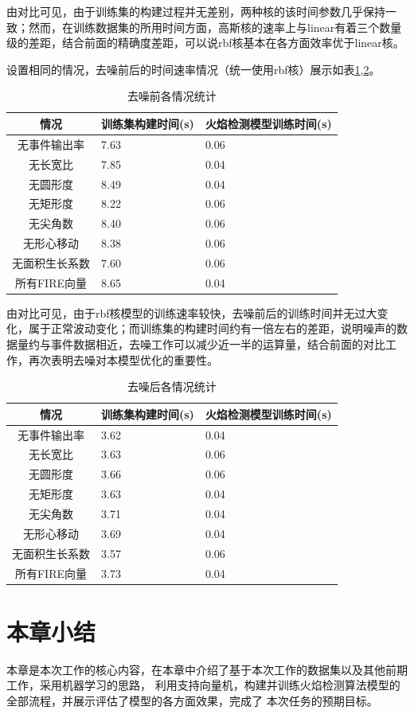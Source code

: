由对比可见，由于训练集的构建过程并无差别，两种核的该时间参数几乎保持一致；然而，在训练数据集的所用时间方面，高斯核的速率上与linear有着三个数量级的差距，结合前面的精确度差距，可以说rbf核基本在各方面效率优于linear核。

设置相同的情况，去噪前后的时间速率情况（统一使用rbf核）展示如表\ref{t_噪前},\ref{t_噪后}。
\begin{table}[ht]
    \centering
    \caption{去噪前各情况统计}
    \begin{tabularx}{0.7\textwidth}{c|X|X}
        \toprule
        情况&训练集构建时间(s)&火焰检测模型训练时间(s)\\
        \midrule
        无事件输出率&7.63&0.06\\
        无长宽比&7.85&0.04\\
        无圆形度&8.49&0.04\\
        无矩形度&8.22&0.06\\
        无尖角数&8.40&0.06\\
        无形心移动&8.38&0.06\\
        无面积生长系数&7.60&0.06\\
        所有FIRE向量&8.65&0.04\\
        \bottomrule
    \end{tabularx}
    \label{t_噪前}
\end{table}



由对比可见，由于rbf核模型的训练速率较快，去噪前后的训练时间并无过大变化，属于正常波动变化；而训练集的构建时间约有一倍左右的差距，说明噪声的数据量约与事件数据相近，去噪工作可以减少近一半的运算量，结合前面的对比工作，再次表明去噪对本模型优化的重要性。
\begin{table}[ht]
    \centering
    \caption{去噪后各情况统计}
    \begin{tabularx}{0.7\textwidth}{c|X|X}
        \toprule
        情况&训练集构建时间(s)&火焰检测模型训练时间(s)\\
        \midrule
        无事件输出率&3.62&0.04\\
        无长宽比&3.63&0.06\\
        无圆形度&3.66&0.06\\
        无矩形度&3.63&0.04\\
        无尖角数&3.71&0.04\\
        无形心移动&3.69&0.04\\
        无面积生长系数&3.57&0.06\\
        所有FIRE向量&3.73&0.04\\
        \bottomrule
    \end{tabularx}
    \label{t_噪后}
\end{table}















\section{本章小结}
本章是本次工作的核心内容，在本章中介绍了基于本次工作的数据集以及其他前期工作，采用机器学习的思路，
利用支持向量机，构建并训练火焰检测算法模型的全部流程，并展示评估了模型的各方面效果，完成了
本次任务的预期目标。